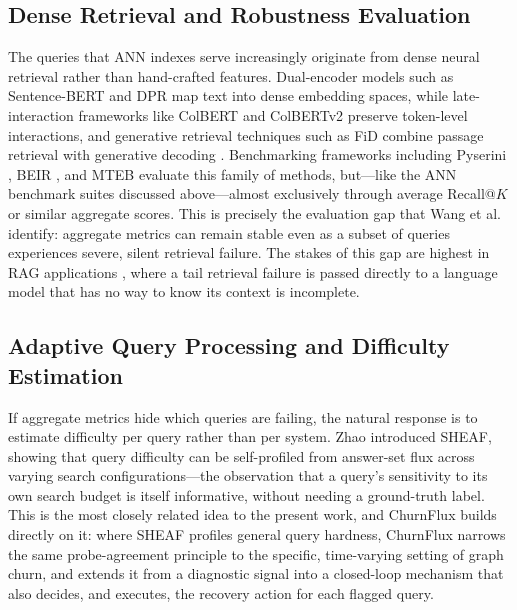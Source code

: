 \documentclass{ieeeaccess}
\begin{document}
\subsection{Dense Retrieval and Robustness Evaluation}
The queries that ANN indexes serve increasingly originate from dense neural retrieval rather than hand-crafted features. Dual-encoder models such as Sentence-BERT \cite{Reimers2019} and DPR \cite{Karpukhin2020} map text into dense embedding spaces, while late-interaction frameworks like ColBERT \cite{Khattab2020} and ColBERTv2 \cite{Santhanam2022} preserve token-level interactions, and generative retrieval techniques such as FiD \cite{Izacard2021} combine passage retrieval with generative decoding \cite{Chen2024, Devlin2019}. Benchmarking frameworks including Pyserini \cite{Lin2021}, BEIR \cite{Thakur2021}, and MTEB \cite{Muennighoff2023} evaluate this family of methods, but---like the ANN benchmark suites discussed above---almost exclusively through average Recall@$K$ or similar aggregate scores. This is precisely the evaluation gap that Wang et al. \cite{Robust2025} identify: aggregate metrics can remain stable even as a subset of queries experiences severe, silent retrieval failure. The stakes of this gap are highest in RAG applications \cite{Lewis2020, Lewis2020_52, Gao2023_50, Zhao2024_40, Zhao2024_51, RAGSurvey2024, Guo2024_27}, where a tail retrieval failure is passed directly to a language model that has no way to know its context is incomplete.
\subsection{Adaptive Query Processing and Difficulty Estimation}
If aggregate metrics hide which queries are failing, the natural response is to estimate difficulty per query rather than per system. Zhao \cite{Sheaf2026} introduced SHEAF, showing that query difficulty can be self-profiled from answer-set flux across varying search configurations---the observation that a query's sensitivity to its own search budget is itself informative, without needing a ground-truth label. This is the most closely related idea to the present work, and ChurnFlux builds directly on it: where SHEAF profiles general query hardness, ChurnFlux narrows the same probe-agreement principle to the specific, time-varying setting of graph churn, and extends it from a diagnostic signal into a closed-loop mechanism that also decides, and executes, the recovery action for each flagged query.
\end{document}
